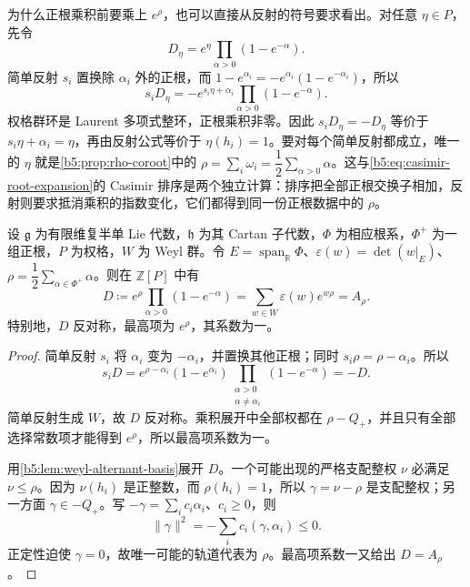 为什么正根乘积前要乘上 \(e^\rho\)，也可以直接从反射的符号要求看出。对任意 \(\eta\in P\)，先令
\[
	D_\eta=e^\eta\prod_{\alpha>0}(1-e^{-\alpha}).
\]
简单反射 \(s_i\) 置换除 \(\alpha_i\) 外的正根，而 \(1-e^{\alpha_i}=-e^{\alpha_i}(1-e^{-\alpha_i})\)，所以
\[
	s_iD_\eta=-e^{s_i\eta+\alpha_i} \prod_{\alpha>0}(1-e^{-\alpha}).
\]
权格群环是 Laurent 多项式整环，正根乘积非零。因此 \(s_iD_\eta=-D_\eta\) 等价于 \(s_i\eta+\alpha_i=\eta\)，再由反射公式等价于 \(\eta(h_i)=1\)。要对每个简单反射都成立，唯一的 \(\eta\) 就是\cref{b5:prop:rho-coroot}中的 \(\rho=\sum_i\omega_i=\dfrac12\sum_{\alpha>0}\alpha\)。这与\eqref{b5:eq:casimir-root-expansion}的 Casimir 排序是两个独立计算：排序把全部正根交换子相加，反射则要求抵消乘积的指数变化，它们都得到同一份正根数据中的 \(\rho\)。

\begin{theorem}\label{b5:thm:weyl-denominator}
	设 \(\mathfrak g\) 为有限维复半单 Lie 代数，\(\mathfrak h\) 为其 Cartan 子代数，\(\Phi\) 为相应根系，\(\Phi^+\) 为一组正根，\(P\) 为权格，\(W\) 为 Weyl 群。令 \(E=\operatorname{span}_{\mathbb R}\Phi\)、\(\varepsilon(w)=\det(w|_E)\)、\(\rho=\dfrac12\sum_{\alpha\in\Phi^+}\alpha\)。则在 \(\mathbb Z[P]\) 中有
	\begin{equation}\label{b5:eq:weyl-denominator}
		D\coloneqq e^\rho\prod_{\alpha>0}(1-e^{-\alpha}) =\sum_{w\in W}\varepsilon(w)e^{w\rho}=A_\rho.
	\end{equation}
	特别地，\(D\) 反对称，最高项为 \(e^\rho\)，其系数为一。
\end{theorem}
\begin{proof}
	简单反射 \(s_i\) 将 \(\alpha_i\) 变为 \(-\alpha_i\)，并置换其他正根；同时 \(s_i\rho=\rho-\alpha_i\)。所以
	\[
		s_iD=e^{\rho-\alpha_i}(1-e^{\alpha_i}) \prod_{\substack{\alpha>0\\\alpha\ne\alpha_i}}(1-e^{-\alpha})=-D.
	\]
	简单反射生成 \(W\)，故 \(D\) 反对称。乘积展开中全部权都在 \(\rho-Q_+\)，并且只有全部选择常数项才能得到 \(e^\rho\)，所以最高项系数为一。

	用\cref{b5:lem:weyl-alternant-basis}展开 \(D\)。一个可能出现的严格支配整权 \(\nu\) 必满足 \(\nu\le\rho\)。因为 \(\nu(h_i)\) 是正整数，而 \(\rho(h_i)=1\)，所以 \(\gamma=\nu-\rho\) 是支配整权；另一方面 \(\gamma\in-Q_+\)。写 \(-\gamma=\sum_i c_i\alpha_i\)、\(c_i\ge0\)，则
	\[
		\|\gamma\|^2=-\sum_i c_i(\gamma,\alpha_i)\le0.
	\]
	正定性迫使 \(\gamma=0\)，故唯一可能的轨道代表为 \(\rho\)。最高项系数一又给出 \(D=A_\rho\)。
\end{proof}

